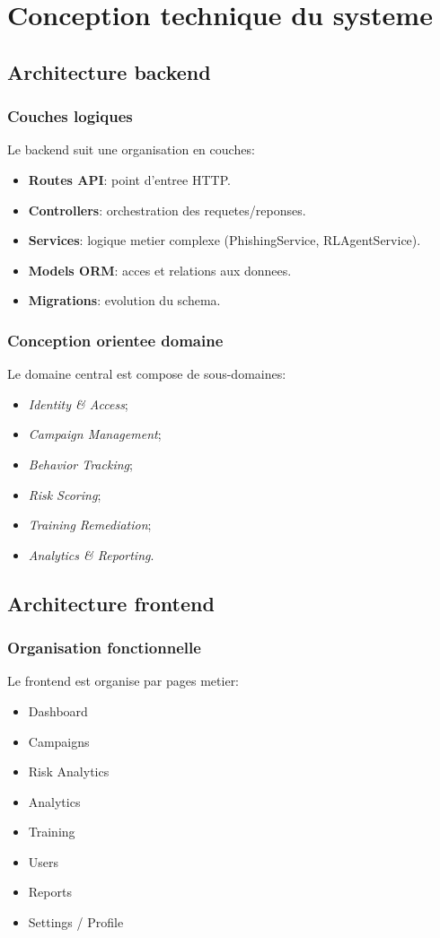 \documentclass[12pt,a4paper,oneside]{report}
\begin{document}
\chapter{Conception technique du systeme}

\section{Architecture backend}
\subsection{Couches logiques}
Le backend suit une organisation en couches:
\begin{itemize}[leftmargin=1.2cm]
  \item \textbf{Routes API}: point d'entree HTTP.
  \item \textbf{Controllers}: orchestration des requetes/reponses.
  \item \textbf{Services}: logique metier complexe (PhishingService, RLAgentService).
  \item \textbf{Models ORM}: acces et relations aux donnees.
  \item \textbf{Migrations}: evolution du schema.
\end{itemize}

\subsection{Conception orientee domaine}
Le domaine central est compose de sous-domaines:
\begin{itemize}[leftmargin=1.2cm]
  \item \textit{Identity \& Access};
  \item \textit{Campaign Management};
  \item \textit{Behavior Tracking};
  \item \textit{Risk Scoring};
  \item \textit{Training Remediation};
  \item \textit{Analytics \& Reporting}.
\end{itemize}

\section{Architecture frontend}
\subsection{Organisation fonctionnelle}
Le frontend est organise par pages metier:
\begin{itemize}[leftmargin=1.2cm]
  \item Dashboard
  \item Campaigns
  \item Risk Analytics
  \item Analytics
  \item Training
  \item Users
  \item Reports
  \item Settings / Profile
\end{itemize}
\end{document}
